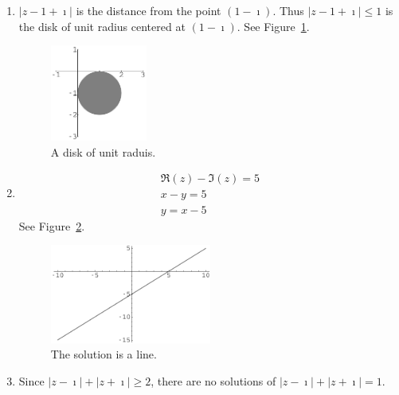 {%
\begin{Solution}
  \label{solution z-1+i 1}
  \begin{enumerate}
  \item
    $|z - 1 + \imath|$ is the distance from the point $(1 - \imath)$.  Thus 
    $|z - 1 + \imath| \leq 1$ is
    the disk of unit radius centered at $(1 - \imath)$.
    See Figure~\ref{disk_1_mi}.
    \begin{figure}[h!]
      \begin{center}
        \includegraphics[width=0.3\textwidth]{fcv/number/disk_1_mi}
      \end{center}
      \caption{A disk of unit raduis.}
      \label{disk_1_mi}
    \end{figure}
  \item
    \begin{gather*}
      \Re(z)- \Im(z) = 5 
      \\
      x - y = 5 
      \\
      y = x - 5
    \end{gather*}
    See Figure~\ref{line_yx5}.
    \begin{figure}[h!]
      \begin{center}
        \includegraphics[width=0.5\textwidth]{fcv/number/line_yx5}
      \end{center}
      \caption{The solution is a line.}
      \label{line_yx5}
    \end{figure}
  \item
    Since $|z - \imath| + |z + \imath| \geq 2$, there are no solutions of 
    $|z - \imath| + |z + \imath| = 1$.
  \end{enumerate}
\end{Solution}









}
